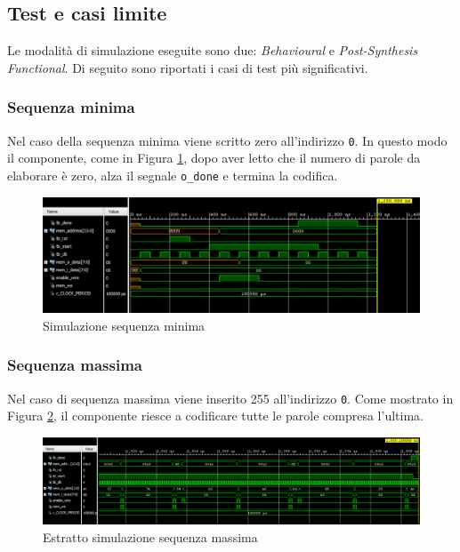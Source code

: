 \documentclass{article}
\begin{document}
\subsection{Test e casi limite}
Le modalità di simulazione eseguite sono due: \textit{Behavioural} e \textit{Post-Synthesis Functional}. Di seguito sono riportati i casi di test più significativi.

\subsubsection{Sequenza minima}
Nel caso della sequenza minima viene scritto zero all'indirizzo \verb|0|. In questo modo il componente, come in Figura \ref{fig:Seq_Min}, dopo aver letto che il numero di parole da elaborare è zero, alza il segnale \verb|o_done| e termina la codifica.\\
\begin{figure}[h]
    \vspace{5pt}
    \centering
    \includegraphics[width=\textwidth]{Resources/Seq_Min.png}
    \caption{Simulazione sequenza minima}
    \label{fig:Seq_Min}
    \vspace{5pt}
\end{figure}

\subsubsection{Sequenza massima}
Nel caso di sequenza massima viene inserito 255 all'indirizzo \verb|0|. Come mostrato in Figura \ref{fig:Seq_Max}, il componente riesce a codificare tutte le parole compresa l'ultima.\\
\begin{figure}[h]
    \vspace{5pt}
    \centering
    \includegraphics[width=\textwidth]{Resources/Seq_Max.png}
    \caption{Estratto simulazione sequenza massima}
    \label{fig:Seq_Max}
    \vspace{5pt}
\end{figure}
\end{document}
